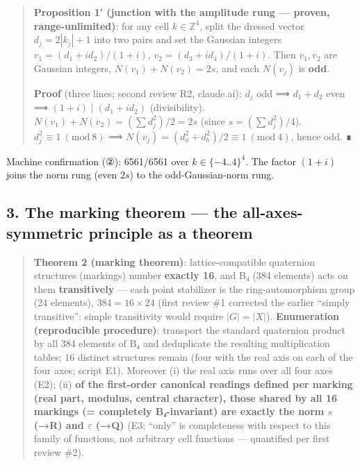 \documentclass[
]{ltjsarticle}
\begin{document}
\begin{quote}
\textbf{Proposition 1′ (junction with the amplitude rung --- proven,
range-unlimited)}: for any cell \(k\in\mathbb{Z}^4\), split the dressed
vector \(d_j=2|k_j|+1\) into two pairs and set the Gaussian integers
\(v_1=(d_1+id_2)/(1+i)\), \(v_2=(d_3+id_4)/(1+i)\). Then \(v_1,v_2\) are
Gaussian integers, \(N(v_1)+N(v_2)=2s\), and each \(N(v_j)\) is
\textbf{odd}.

\textbf{Proof} (three lines; second review R2, claude.ai): \(d_j\) odd ⟹
\(d_1+d_2\) even ⟹ \((1+i)\mid(d_1+id_2)\) (divisibility).
\(N(v_1)+N(v_2)=(\sum d_j^2)/2=2s\) (since \(s=(\sum d_j^2)/4\)).
\(d_j^2\equiv1\ (\mathrm{mod}\ 8)\) ⟹
\(N(v_j)=(d_a^2+d_b^2)/2\equiv1\ (\mathrm{mod}\ 4)\), hence odd. ∎
\end{quote}

Machine confirmation (②): 6561/6561 over \(k\in\{-4..4\}^4\). The factor
\((1+i)\) joins the norm rung (even \(2s\)) to the odd-Gaussian-norm
rung.

\subsection{3. The marking theorem --- the all-axes-symmetric principle
as a
theorem}\label{the-marking-theorem-the-all-axes-symmetric-principle-as-a-theorem}

\begin{quote}
\textbf{Theorem 2 (marking theorem)}: lattice-compatible quaternion
structures (markings) number \textbf{exactly 16}, and B₄ (384 elements)
acts on them \textbf{transitively} --- each point stabilizer is the
ring-automorphism group (24 elements), \(384=16\times24\) (first review
\#1 corrected the earlier ``simply transitive'': simple transitivity
would require \(|G|=|X|\)). \textbf{Enumeration (reproducible
procedure)}: transport the standard quaternion product by all 384
elements of B₄ and deduplicate the resulting multiplication tables; 16
distinct structures remain (four with the real axis on each of the four
axes; script E1). Moreover (i) the real axis runs over all four axes
(E2); (ii) \textbf{of the first-order canonical readings defined per
marking (real part, modulus, central character), those shared by all 16
markings (= completely B₄-invariant) are exactly the norm \(s\) (→R) and
\(\varepsilon\) (→Q)} (E3; ``only'' is completeness with respect to this
family of functions, not arbitrary cell functions --- quantified per
first review \#2).
\end{quote}
\end{document}
